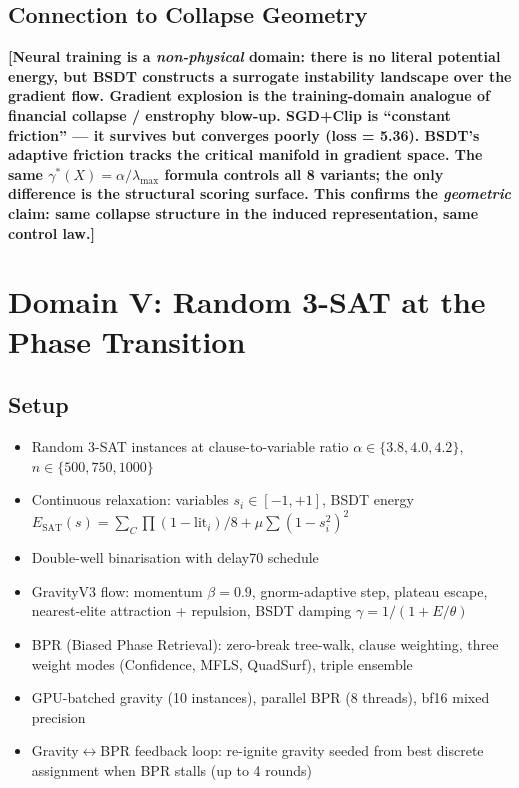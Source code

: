 \documentclass[11pt,a4paper]{article}
\begin{document}
\subsection{Connection to Collapse Geometry}
\textbf{[Neural training is a \emph{non-physical} domain: there is
no literal potential energy, but BSDT constructs a surrogate
instability landscape over the gradient flow.  Gradient explosion
is the training-domain analogue of financial collapse / enstrophy
blow-up.  SGD+Clip is ``constant friction'' --- it survives but
converges poorly (loss = 5.36).  BSDT's adaptive friction tracks
the critical manifold in gradient space.  The same
$\gamma^*(X) = \alpha / \lambda_{\max}$ formula controls all 8
variants; the only difference is the structural scoring surface.
This confirms the \emph{geometric} claim: same collapse structure
in the induced representation, same control law.]}


\section{Domain V: Random 3-SAT at the Phase Transition}\label{sec:sat}

\subsection{Setup}
\begin{itemize}[nosep]
  \item Random 3-SAT instances at clause-to-variable ratio
        $\alpha \in \{3.8, 4.0, 4.2\}$, $n \in \{500, 750, 1000\}$
  \item Continuous relaxation: variables $s_i \in [-1, +1]$, BSDT energy
        $E_{\mathrm{SAT}}(s) = \sum_C \prod (1 - \mathrm{lit}_i) / 8
        + \mu \sum (1 - s_i^2)^2$
  \item Double-well binarisation with delay70 schedule
  \item GravityV3 flow: momentum $\beta = 0.9$, gnorm-adaptive step,
        plateau escape, nearest-elite attraction + repulsion,
        BSDT damping $\gamma = 1/(1 + E/\theta)$
  \item BPR (Biased Phase Retrieval): zero-break tree-walk, clause weighting,
        three weight modes (Confidence, MFLS, QuadSurf), triple ensemble
  \item GPU-batched gravity (10 instances), parallel BPR (8 threads),
        bf16 mixed precision
  \item Gravity$\leftrightarrow$BPR feedback loop: re-ignite gravity seeded
        from best discrete assignment when BPR stalls (up to 4 rounds)
\end{itemize}
\end{document}
